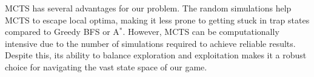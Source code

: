 MCTS has several advantages for our problem. The random simulations help MCTS to escape local optima, making it less prone to getting stuck in trap states compared to Greedy BFS or A$^*$. However, MCTS can be computationally intensive due to the number of simulations required to achieve reliable results. Despite this, its ability to balance exploration and exploitation makes it a robust choice for navigating the vast state space of our game.
